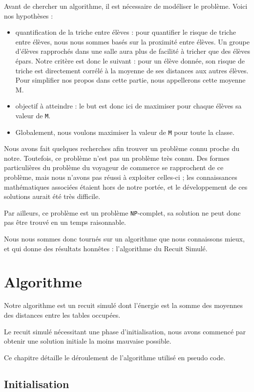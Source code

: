 \documentclass[11pt,a4paper, openany]{book}
\begin{document}
Avant de chercher un algorithme, il est nécessaire de modéliser le problème.
Voici nos hypothèses : 
\begin{itemize}
\item quantification de la triche entre élèves : pour quantifier le risque de triche entre élèves, nous nous sommes basés sur la proximité entre élèves. Un groupe d'élèves rapprochés dans une salle aura plus de facilité à tricher que des élèves épars.
Notre critère est donc le suivant : pour un élève donnée, son risque de triche est directement corrélé à la moyenne de ses distances aux autres élèves.
Pour simplifier nos propos dans cette partie, nous appellerons cette moyenne M.
\item objectif à atteindre : le but est donc ici de maximiser pour chaque élèves sa valeur de \texttt{M}.
\item Globalement, nous voulons maximiser la valeur de \texttt{M} pour toute la classe.
\end{itemize}

Nous avons fait quelques recherches afin trouver un problème connu proche du notre.
Toutefois, ce problème n'est pas un problème très connu. Des formes particulières du problème du voyageur de commerce se rapprochent de ce problème, mais nous n'avons pas réussi à exploiter celles-ci ; les connaissances mathématiques associées étaient hors de notre portée, et le développement de ces solutions aurait été très difficile.

Par ailleurs, ce problème est un problème \texttt{NP}-complet, sa solution ne peut donc pas être trouvé en un temps raisonnable.

Nous nous sommes donc tournés sur un algorithme que nous connaissons mieux, et qui donne des résultats honnêtes : l'algorithme du Recuit Simulé.


\chapter{Algorithme}

Notre algorithme est un recuit simulé dont l'énergie est la somme des moyennes des distances entre les tables occupées.

Le recuit simulé nécessitant une phase d'initialisation, nous avons commencé par obtenir une solution initiale la moins mauvaise possible.

Ce chapitre détaille le déroulement de l'algorithme utilisé en pseudo code.

\section{Initialisation}
\label{init}
\end{document}
